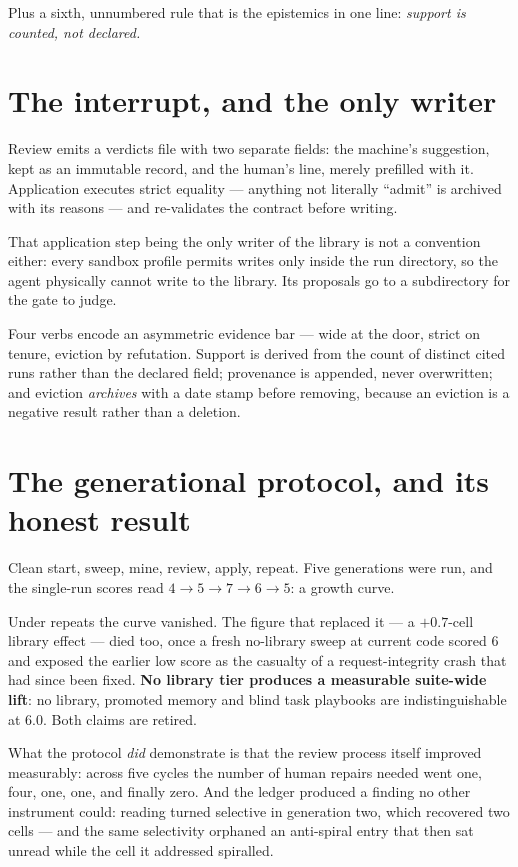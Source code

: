 \documentclass[11pt,a4paper]{report}
\begin{document}
\noindent
Plus a sixth, unnumbered rule that is the epistemics in one line:
\emph{support is counted, not declared.}

\section{The interrupt, and the only writer}

Review emits a verdicts file with two separate fields: the machine's suggestion,
kept as an immutable record, and the human's line, merely prefilled with it.
Application executes strict equality --- anything not literally ``admit'' is
archived with its reasons --- and re-validates the contract before writing.

That application step being the only writer of the library is not a convention
either: every sandbox profile permits writes only inside the run directory, so
the agent physically cannot write to the library. Its proposals go to a
subdirectory for the gate to judge.

Four verbs encode an asymmetric evidence bar --- wide at the door, strict on
tenure, eviction by refutation. Support is derived from the count of distinct
cited runs rather than the declared field; provenance is appended, never
overwritten; and eviction \emph{archives} with a date stamp before removing,
because an eviction is a negative result rather than a deletion.

\section{The generational protocol, and its honest result}

Clean start, sweep, mine, review, apply, repeat. Five generations were run, and
the single-run scores read $4 \to 5 \to 7 \to 6 \to 5$: a growth curve.

\begin{caution}[title={The curve died, and so did its replacement}]
Under repeats the curve vanished. The figure that replaced it --- a $+0.7$-cell
library effect --- died too, once a fresh no-library sweep at current code
scored 6 and exposed the earlier low score as the casualty of a
request-integrity crash that had since been fixed. \textbf{No library tier
produces a measurable suite-wide lift}: no library, promoted memory and blind
task playbooks are indistinguishable at 6.0. Both claims are retired.
\end{caution}

\noindent
What the protocol \emph{did} demonstrate is that the review process itself
improved measurably: across five cycles the number of human repairs needed went
one, four, one, one, and finally zero. And the ledger produced a finding no
other instrument could: reading turned selective in generation two, which
recovered two cells --- and the same selectivity orphaned an anti-spiral entry
that then sat unread while the cell it addressed spiralled.
\end{document}
